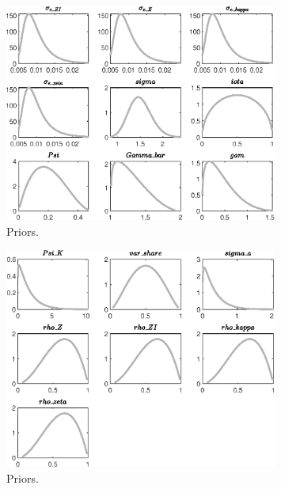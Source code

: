  
\begin{figure}[H]
\centering
\includegraphics[width=0.80\textwidth]{directed_search_est/graphs/directed_search_est_Priors1}
\caption{Priors.}\label{Fig:Priors:1}
\end{figure}
\begin{figure}[H]
\centering
\includegraphics[width=0.80\textwidth]{directed_search_est/graphs/directed_search_est_Priors2}
\caption{Priors.}\label{Fig:Priors:2}
\end{figure}
 
